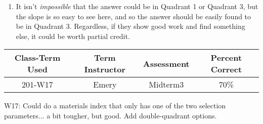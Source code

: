 \begin{rubric}
	\begin{enumerate}
		\item It isn't \emph{impossible} that the answer could be in Quadrant 1 or Quadrant 3, but the slope is so easy to see here, and so the answer should be easily found to be in Quadrant 3. Regardless, if they show good work and find something else, it could be worth partial credit.
	\end{enumerate}


\end{rubric}

\begin{outcomes}
	\begin{center}
		\begin{tabular}{cccc}
			\hline\hline
			Class-Term Used & Term Instructor & Assessment & Percent Correct\\
			\hline
			201-W17 & Emery & Midterm3 & 70\%\\    %
			\hline
		\end{tabular}
	\end{center}
\end{outcomes}

\begin{comments}

W17: Could do a materials index that only has one of the two selection parameters... a bit tougher, but good. Add double-quadrant options.
	
\end{comments}

